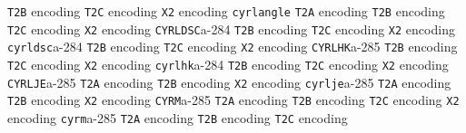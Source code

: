 \documentclass[twoside]{ltxdoc}
\makeatletter
\renewenvironment{theindex}{%
   \@restonecoltrue
   \if@twocolumn\@restonecolfalse\fi
   \columnseprule \z@
   \columnsep 35\p@
   \twocolumn[\index@prologue]%
   \IndexParms
   \let\item\@idxitem
   \ignorespaces
}{\if@restonecol\onecolumn\else\clearpage\fi}
\makeatother
\begin{document}
\begin{theindex}
    \subitem \texttt  {T2B} encoding\pfill {}
    \subitem \texttt  {T2C} encoding\pfill {}
    \subitem \texttt  {X2} encoding\pfill {}
  \item \texttt  {cyrlangle}\efill 
    \subitem \texttt  {T2A} encoding\pfill {}
    \subitem \texttt  {T2B} encoding\pfill {}
    \subitem \texttt  {T2C} encoding\pfill {}
    \subitem \texttt  {X2} encoding\pfill {}
  \item \texttt  {CYRLDSC}\pfill a-284
    \subitem \texttt  {T2B} encoding\pfill {}
    \subitem \texttt  {T2C} encoding\pfill {}
    \subitem \texttt  {X2} encoding\pfill {}
  \item \texttt  {cyrldsc}\pfill a-284
    \subitem \texttt  {T2B} encoding\pfill {}
    \subitem \texttt  {T2C} encoding\pfill {}
    \subitem \texttt  {X2} encoding\pfill {}
  \item \texttt  {CYRLHK}\pfill a-285
    \subitem \texttt  {T2B} encoding\pfill {}
    \subitem \texttt  {T2C} encoding\pfill {}
    \subitem \texttt  {X2} encoding\pfill {}
  \item \texttt  {cyrlhk}\pfill a-284
    \subitem \texttt  {T2B} encoding\pfill {}
    \subitem \texttt  {T2C} encoding\pfill {}
    \subitem \texttt  {X2} encoding\pfill {}
  \item \texttt  {CYRLJE}\pfill a-285
    \subitem \texttt  {T2A} encoding\pfill {}
    \subitem \texttt  {T2B} encoding\pfill {}
    \subitem \texttt  {X2} encoding\pfill {}
  \item \texttt  {cyrlje}\pfill a-285
    \subitem \texttt  {T2A} encoding\pfill {}
    \subitem \texttt  {T2B} encoding\pfill {}
    \subitem \texttt  {X2} encoding\pfill {}
  \item \texttt  {CYRM}\pfill a-285
    \subitem \texttt  {T2A} encoding\pfill {}
    \subitem \texttt  {T2B} encoding\pfill {}
    \subitem \texttt  {T2C} encoding\pfill {}
    \subitem \texttt  {X2} encoding\pfill {}
  \item \texttt  {cyrm}\pfill a-285
    \subitem \texttt  {T2A} encoding\pfill {}
    \subitem \texttt  {T2B} encoding\pfill {}
    \subitem \texttt  {T2C} encoding\pfill {}

\end{theindex}
\end{document}
